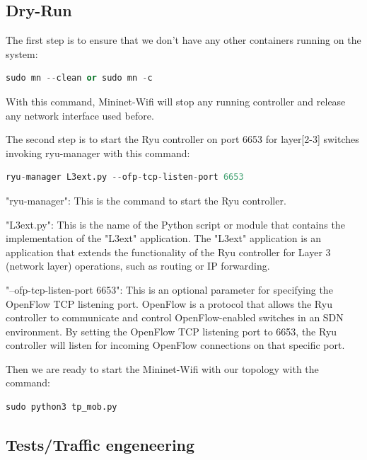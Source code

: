 \documentclass[
  oneside,
  11pt, a4paper,
  footinclude=true,
  headinclude=true,
  cleardoublepage=empty
]{scrbook}
\begin{document}
\subsection{Dry-Run}

The first step is to ensure that we don't have any other containers running on the system:
\begin{lstlisting}[language=Python, caption=Cleaning system environment]
sudo mn --clean or sudo mn -c
\end{lstlisting}

With this command, Mininet-Wifi will stop any running controller and release any network interface used before. 
\par

The second step is to start the Ryu controller on port 6653 for layer[2-3] switches invoking ryu-manager with this command:
\begin{lstlisting}[language=Python, caption=Starting Ryu controller on port 6653]
ryu-manager L3ext.py --ofp-tcp-listen-port 6653
\end{lstlisting}

"ryu-manager": This is the command to start the Ryu controller. 

"L3ext.py": This is the name of the Python script or module that contains the implementation of the "L3ext" application. The "L3ext" application is an application that extends the functionality of the Ryu controller for Layer 3 (network layer) operations, such as routing or IP forwarding.

"--ofp-tcp-listen-port 6653": This is an optional parameter for specifying the OpenFlow TCP listening port. OpenFlow is a protocol that allows the Ryu controller to communicate and control OpenFlow-enabled switches in an SDN environment. By setting the OpenFlow TCP listening port to 6653, the Ryu controller will listen for incoming OpenFlow connections on that specific port.



Then we are ready to start the Mininet-Wifi with our topology with the command:
\begin{lstlisting}[language=Python, caption=Starting Mininet-Wifi]
sudo python3 tp_mob.py
\end{lstlisting}

\subsection{Tests/Traffic engeneering}
\label{Tests}
\end{document}
